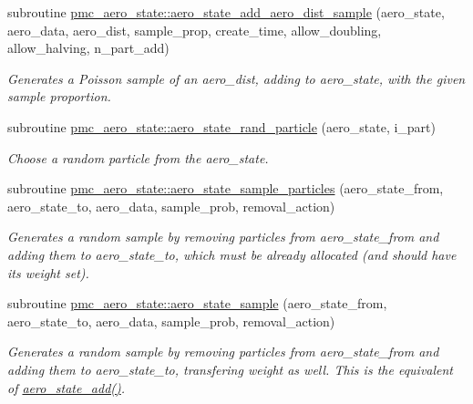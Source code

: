 \begin{DoxyCompactItemize}
subroutine \mbox{\hyperlink{namespacepmc__aero__state_a28368fd18fc170709b6809de1930037d}{pmc\+\_\+aero\+\_\+state\+::aero\+\_\+state\+\_\+add\+\_\+aero\+\_\+dist\+\_\+sample}} (aero\+\_\+state, aero\+\_\+data, aero\+\_\+dist, sample\+\_\+prop, create\+\_\+time, allow\+\_\+doubling, allow\+\_\+halving, n\+\_\+part\+\_\+add)
\begin{DoxyCompactList}\small\item\em Generates a Poisson sample of an {\ttfamily aero\+\_\+dist}, adding to {\ttfamily aero\+\_\+state}, with the given sample proportion. \end{DoxyCompactList}\item 
subroutine \mbox{\hyperlink{namespacepmc__aero__state_ab4369f9cfc8e1fdc80c6cd2aced773c9}{pmc\+\_\+aero\+\_\+state\+::aero\+\_\+state\+\_\+rand\+\_\+particle}} (aero\+\_\+state, i\+\_\+part)
\begin{DoxyCompactList}\small\item\em Choose a random particle from the aero\+\_\+state. \end{DoxyCompactList}\item 
subroutine \mbox{\hyperlink{namespacepmc__aero__state_a45e47d79732741df0dacf15d65d7b4a7}{pmc\+\_\+aero\+\_\+state\+::aero\+\_\+state\+\_\+sample\+\_\+particles}} (aero\+\_\+state\+\_\+from, aero\+\_\+state\+\_\+to, aero\+\_\+data, sample\+\_\+prob, removal\+\_\+action)
\begin{DoxyCompactList}\small\item\em Generates a random sample by removing particles from aero\+\_\+state\+\_\+from and adding them to aero\+\_\+state\+\_\+to, which must be already allocated (and should have its weight set). \end{DoxyCompactList}\item 
subroutine \mbox{\hyperlink{namespacepmc__aero__state_a1ccf923e3212b8800371ebd59156ff8f}{pmc\+\_\+aero\+\_\+state\+::aero\+\_\+state\+\_\+sample}} (aero\+\_\+state\+\_\+from, aero\+\_\+state\+\_\+to, aero\+\_\+data, sample\+\_\+prob, removal\+\_\+action)
\begin{DoxyCompactList}\small\item\em Generates a random sample by removing particles from aero\+\_\+state\+\_\+from and adding them to aero\+\_\+state\+\_\+to, transfering weight as well. This is the equivalent of \mbox{\hyperlink{namespacepmc__aero__state_ad9c12bba90caa58b86882ebfe4a4335c}{aero\+\_\+state\+\_\+add()}}. \end{DoxyCompactList}\item 

\end{DoxyCompactItemize}

